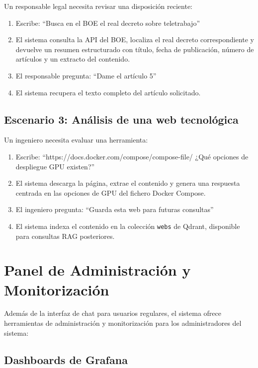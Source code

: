 Un responsable legal necesita revisar una disposición reciente:

\begin{enumerate}
    \item Escribe: ``Busca en el BOE el real decreto sobre teletrabajo''
    \item El sistema consulta la API del BOE, localiza el real decreto correspondiente y devuelve un resumen estructurado con título, fecha de publicación, número de artículos y un extracto del contenido.
    \item El responsable pregunta: ``Dame el artículo 5''
    \item El sistema recupera el texto completo del artículo solicitado.
\end{enumerate}

\subsection{Escenario 3: Análisis de una web tecnológica}

Un ingeniero necesita evaluar una herramienta:

\begin{enumerate}
    \item Escribe: ``https://docs.docker.com/compose/compose-file/ ¿Qué opciones de despliegue GPU existen?''
    \item El sistema descarga la página, extrae el contenido y genera una respuesta centrada en las opciones de GPU del fichero Docker Compose.
    \item El ingeniero pregunta: ``Guarda esta web para futuras consultas''
    \item El sistema indexa el contenido en la colección \texttt{webs} de Qdrant, disponible para consultas RAG posteriores.
\end{enumerate}

\section{Panel de Administración y Monitorización}
\label{sec:admin}

Además de la interfaz de chat para usuarios regulares, el sistema ofrece herramientas de administración y monitorización para los administradores del sistema:

\subsection{Dashboards de Grafana}


